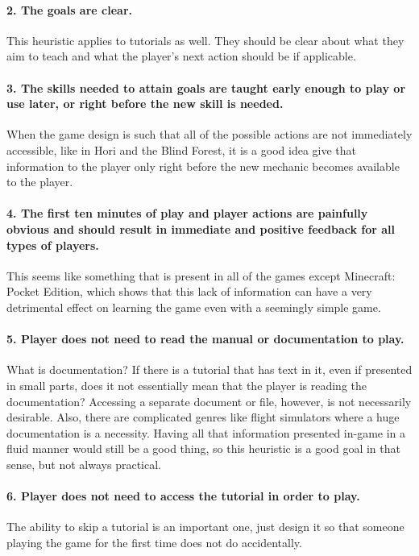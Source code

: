 \paragraph{2. The goals are clear. } This heuristic applies to tutorials as well. They should be clear about what they aim to teach and what the player's next action should be if applicable.

\paragraph{3. The skills needed to attain goals are taught early enough to play or use later, or right before the new skill is needed.} When the game design is such that all of the possible actions are not immediately accessible, like in Hori and the Blind Forest, it is a good idea give that information to the player only right before the new mechanic becomes available to the player. 

\paragraph{4. The first ten minutes of play and player actions are painfully obvious and should result in immediate and positive feedback for all types of players. } This seems like something that is present in all of the games except Minecraft: Pocket Edition, which shows that this lack of information can have a very detrimental effect on learning the game even with a seemingly simple game.

\paragraph{5. Player does not need to read the manual or documentation to play.} What is documentation? If there is a tutorial that has text in it, even if presented in small parts, does it not essentially mean that the player is reading the documentation? Accessing a separate document or file, however, is not necessarily desirable. Also, there are complicated genres like flight simulators where a huge documentation is a necessity. Having all that information presented in-game in a fluid manner would still be a good thing, so this heuristic is a good goal in that sense, but not always practical.

\paragraph{6. Player does not need to access the tutorial in order to play.} The ability to skip a tutorial is an important one, just design it so that someone playing the game for the first time does not do accidentally.

